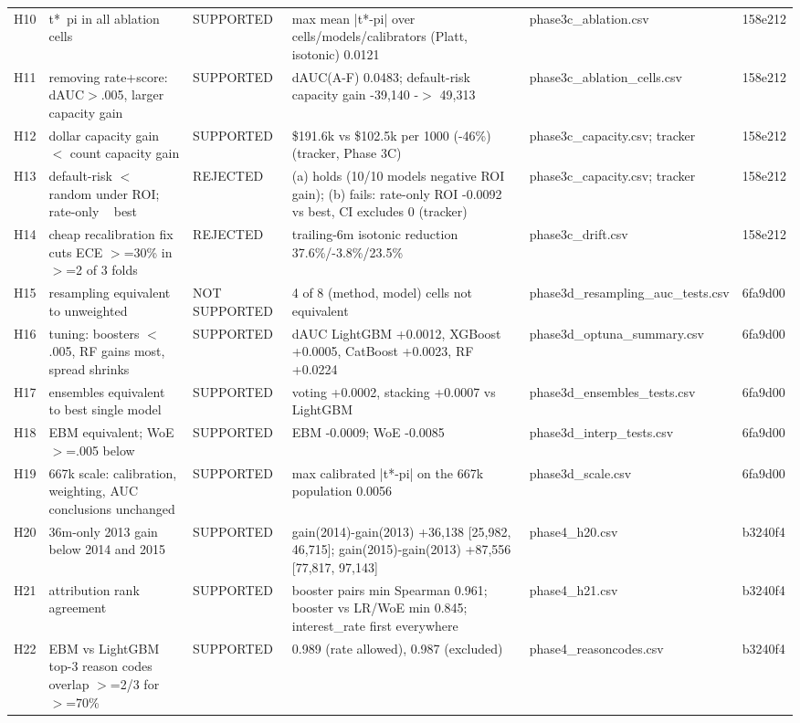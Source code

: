 \begin{tabular}{lp{5.2cm}p{5.2cm}p{5.2cm}lp{5.2cm}}
H10 & t*~pi in all ablation cells & SUPPORTED & max mean |t*-pi| over cells/models/calibrators (Platt, isotonic) 0.0121 & phase3c\_ablation.csv & 158e212 \\
H11 & removing rate+score: dAUC$>$.005, larger capacity gain & SUPPORTED & dAUC(A-F) 0.0483; default-risk capacity gain -39,140 -$>$ 49,313 & phase3c\_ablation\_cells.csv & 158e212 \\
H12 & dollar capacity gain $<$ count capacity gain & SUPPORTED & \$191.6k vs \$102.5k per 1000 (-46\%) (tracker, Phase 3C) & phase3c\_capacity.csv; tracker & 158e212 \\
H13 & default-risk $<$ random under ROI; rate-only ~ best & REJECTED & (a) holds (10/10 models negative ROI gain); (b) fails: rate-only ROI -0.0092 vs best, CI excludes 0 (tracker) & phase3c\_capacity.csv; tracker & 158e212 \\
H14 & cheap recalibration fix cuts ECE $>$=30\% in $>$=2 of 3 folds & REJECTED & trailing-6m isotonic reduction 37.6\%/-3.8\%/23.5\% & phase3c\_drift.csv & 158e212 \\
H15 & resampling equivalent to unweighted & NOT SUPPORTED & 4 of 8 (method, model) cells not equivalent & phase3d\_resampling\_auc\_tests.csv & 6fa9d00 \\
H16 & tuning: boosters $<$.005, RF gains most, spread shrinks & SUPPORTED & dAUC LightGBM +0.0012, XGBoost +0.0005, CatBoost +0.0023, RF +0.0224 & phase3d\_optuna\_summary.csv & 6fa9d00 \\
H17 & ensembles equivalent to best single model & SUPPORTED & voting +0.0002, stacking +0.0007 vs LightGBM & phase3d\_ensembles\_tests.csv & 6fa9d00 \\
H18 & EBM equivalent; WoE $>$=.005 below & SUPPORTED & EBM -0.0009; WoE -0.0085 & phase3d\_interp\_tests.csv & 6fa9d00 \\
H19 & 667k scale: calibration, weighting, AUC conclusions unchanged & SUPPORTED & max calibrated |t*-pi| on the 667k population 0.0056 & phase3d\_scale.csv & 6fa9d00 \\
H20 & 36m-only 2013 gain below 2014 and 2015 & SUPPORTED & gain(2014)-gain(2013) +36,138 [25,982, 46,715]; gain(2015)-gain(2013) +87,556 [77,817, 97,143] & phase4\_h20.csv & b3240f4 \\
H21 & attribution rank agreement & SUPPORTED & booster pairs min Spearman 0.961; booster vs LR/WoE min 0.845; interest\_rate first everywhere & phase4\_h21.csv & b3240f4 \\
H22 & EBM vs LightGBM top-3 reason codes overlap $>$=2/3 for $>$=70\% & SUPPORTED & 0.989 (rate allowed), 0.987 (excluded) & phase4\_reasoncodes.csv & b3240f4 \\

\end{tabular}
